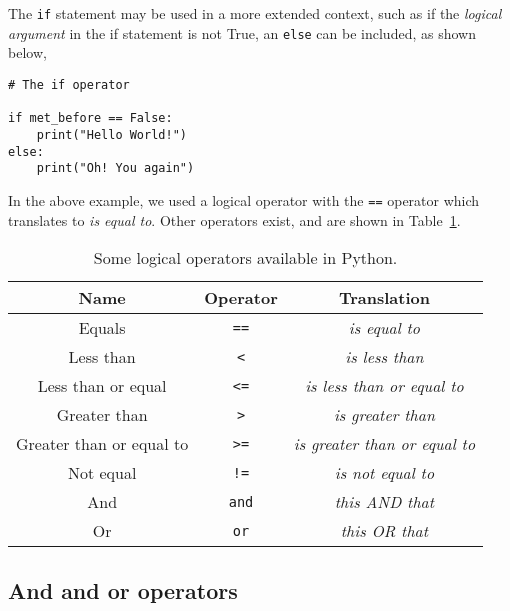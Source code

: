 \documentclass[a4paper]{article}
\begin{document}
The \texttt{if} statement may be used in a more extended context, such as if the \emph{logical argument} in the if statement is not True, an \texttt{else} can be included, as shown below,
\begin{lstlisting}
# The if operator

if met_before == False:
    print("Hello World!")
else:
    print("Oh! You again")
\end{lstlisting}
In the above example, we used a logical operator with the \texttt{==} operator which translates to \emph{is equal to}. 
Other operators exist, and are shown in Table~\ref{tab:ops}.
\begin{table}[h]
	\centering
	\caption{Some logical operators available in Python.}
	\label{tab:ops}
	\begin{tabular}{c c c}
		\hline
		Name & Operator & Translation \\
		\hline
		Equals & \texttt{==} & \emph{is equal to} \\
		Less than & \texttt{<} & \emph{is less than} \\
		Less than or equal & \texttt{<=} & \emph{is less than or equal to} \\
		Greater than & \texttt{>} & \emph{is greater than} \\
		Greater than or equal to & \texttt{>=} & \emph{is greater than or equal to} \\
		Not equal & \texttt{!=} & \emph{is not equal to} \\
		\hline
	    And & \texttt{and} & \emph{this AND that} \\
	    Or & \texttt{or} & \emph{this OR that} \\
		\hline
	\end{tabular}
\end{table}


\subsection{And and or operators}




\end{document}
